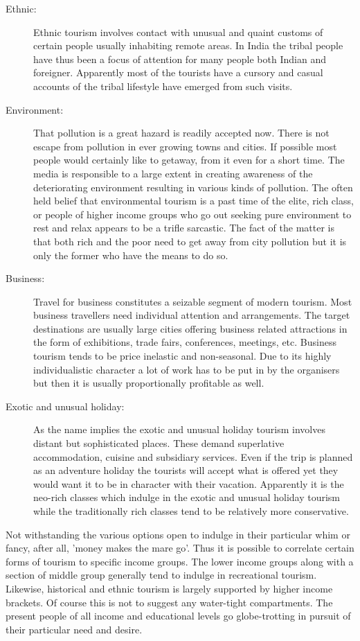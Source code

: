 \begin{description}
  \item[Ethnic:] Ethnic tourism involves contact with unusual and quaint customs of certain people usually inhabiting remote areas. In India the tribal people have thus been a focus of attention for many people both Indian and foreigner. Apparently most of the tourists have a cursory and casual accounts of the tribal lifestyle have emerged from such visits.

  \item[Environment:] That pollution is a great hazard is readily accepted now. There is not escape from pollution in ever growing towns and cities. If possible most people would certainly like to getaway, from it even for a short time. The media is responsible to a large extent in creating awareness of the deteriorating environment resulting in various kinds of pollution. The often held belief that environmental tourism is a past time of the elite, rich class, or people of higher income groups who go out seeking pure environment to rest and relax appears to be a trifle sarcastic. The fact of the matter is that both rich and the poor need to get away from city pollution but it is only the former who have the means to do so.

  \item[Business:] Travel for business constitutes a seizable segment of modern tourism. Most business travellers need individual attention and arrangements. The target destinations are usually large cities offering business related attractions in the form of exhibitions, trade fairs, conferences, meetings, etc. Business tourism tends to be price inelastic and non-seasonal. Due to its highly individualistic character a lot of work has to be put in by the organisers but then it is usually proportionally profitable as well.

  \item[Exotic and unusual holiday:] As the name implies the exotic and unusual holiday tourism involves distant but sophisticated places. These demand superlative accommodation, cuisine and subsidiary services. Even if the trip is planned as an adventure holiday the tourists will accept what is offered yet they would want it to be in character with their vacation. Apparently it is the neo-rich classes which indulge in the exotic and unusual holiday tourism while the traditionally rich classes tend to be relatively more conservative.

\end{description}

Not withstanding the various options open to indulge in their particular whim or fancy, after all, 'money makes the mare go'. Thus it is possible to correlate certain forms of tourism to specific income groups. The lower income groups along with a section of middle group generally tend to indulge in recreational tourism. Likewise, historical and ethnic tourism is largely supported by higher income brackets. Of course this is not to suggest any water-tight compartments. The present people of all income and educational levels go globe-trotting in pursuit of their particular need and desire.

